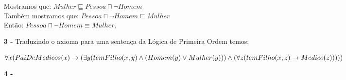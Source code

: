 \documentclass[12pt]{article}
\begin{document}
\begin{itemize}
			Mostramos que: $Mulher \sqsubseteq Pessoa \sqcap \neg Homem$\\
			Também mostramos que: $Pessoa \sqcap \neg Homem \sqsubseteq Mulher$\\
			Então: $Pessoa \sqcap \neg Homem \equiv Mulher$.
		\item[\textbf{3 -}]
			\hfill\newline
			Traduzindo o axioma para uma sentença da Lógica de Primeira Ordem temos:\\
			\begin{footnotesize}
			$\forall x( PaiDeMedicos(x) \rightarrow \\ (\exists y(temFilho(x, y) \wedge (Homem(y) \vee Mulher(y))) \wedge (\forall z (temFilho(x, z) \rightarrow Medico(z)))))$
			\end{footnotesize}			
		\item[\textbf{4 -}]
	\end{itemize}
\end{document}
